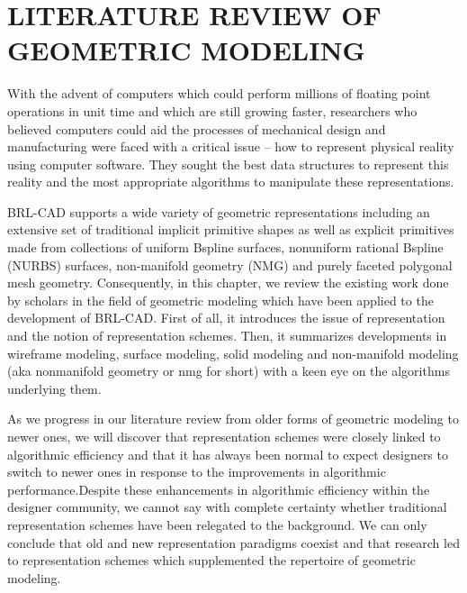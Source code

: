 \chapter{LITERATURE REVIEW OF GEOMETRIC MODELING}
\label{Literature Review}


\hspace{30} With the advent of computers which could perform millions of floating
point operations in unit time and which are still growing faster, researchers who
believed computers could aid the processes of mechanical design and
manufacturing were faced with a critical issue – how to represent physical
reality using computer software. They sought the best data structures to
represent this reality and the most appropriate algorithms to manipulate these representations.

\hspace{30} BRL-­CAD supports a wide variety of geometric representations including an 
extensive set of traditional implicit primitive shapes as well as explicit primitives
made from collections of uniform B­spline surfaces, non­uniform rational B­spline (NURBS)
surfaces, n­on-manifold   geometry   (NMG)   and purely faceted polygonal mesh geometry.
Consequently, in this chapter, we review the existing work done by scholars in the 
field of geometric modeling which have been applied to the development of BRL-­CAD. 
First of all, it introduces the issue of representation and the notion of representation
 schemes. Then, it summarizes developments in wireframe modeling, surface modeling, solid
modeling and non­-manifold modeling (aka non­manifold geometry or nmg for short) with a keen
 eye on the algorithms underlying them.

\hspace{30} As we progress in our literature review from older forms of geometric
modeling to newer ones, we will discover that representation schemes were
closely linked to algorithmic efficiency and that it has always been normal to
expect designers to switch to newer ones in response to the improvements in
algorithmic performance.Despite these enhancements in algorithmic efficiency
within the designer community, we cannot say with complete certainty whether
traditional representation schemes have been relegated to the background. We
can only conclude that old and new representation paradigms co­exist and that
research led to representation schemes which supplemented the repertoire of
geometric modeling.  

